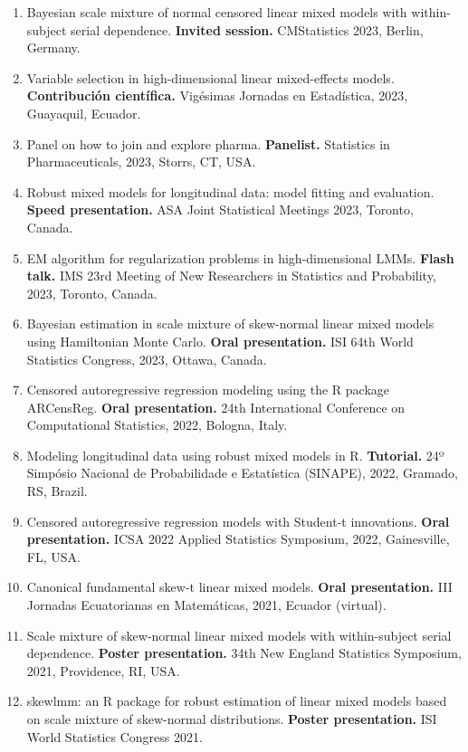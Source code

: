 \documentclass[
  10pt,
  letterpaper,
]{article}
\begin{document}
\begin{enumerate}
  Storrs, CT, USA.
\item
  Bayesian scale mixture of normal censored linear mixed models with
  within-subject serial dependence. \textbf{Invited session.}
  CMStatistics 2023, Berlin, Germany.
\item
  Variable selection in high-dimensional linear mixed-effects models.
  \textbf{Contribución científica.} Vigésimas Jornadas en Estadística,
  2023, Guayaquil, Ecuador.
\item
  Panel on how to join and explore pharma. \textbf{Panelist.} Statistics
  in Pharmaceuticals, 2023, Storrs, CT, USA.
\item
  Robust mixed models for longitudinal data: model fitting and
  evaluation. \textbf{Speed presentation.} ASA Joint Statistical
  Meetings 2023, Toronto, Canada.
\item
  EM algorithm for regularization problems in high-dimensional LMMs.
  \textbf{Flash talk.} IMS 23rd Meeting of New Researchers in Statistics
  and Probability, 2023, Toronto, Canada.
\item
  Bayesian estimation in scale mixture of skew-normal linear mixed
  models using Hamiltonian Monte Carlo. \textbf{Oral presentation.} ISI
  64th World Statistics Congress, 2023, Ottawa, Canada.
\item
  Censored autoregressive regression modeling using the R package
  ARCensReg. \textbf{Oral presentation.} 24th International Conference
  on Computational Statistics, 2022, Bologna, Italy.
\item
  Modeling longitudinal data using robust mixed models in R.
  \textbf{Tutorial.} 24º Simpósio Nacional de Probabilidade e
  Estatística (SINAPE), 2022, Gramado, RS, Brazil.
\item
  Censored autoregressive regression models with Student-t innovations.
  \textbf{Oral presentation.} ICSA 2022 Applied Statistics Symposium,
  2022, Gainesville, FL, USA.
\item
  Canonical fundamental skew-t linear mixed models. \textbf{Oral
  presentation.} III Jornadas Ecuatorianas en Matemáticas, 2021, Ecuador
  (virtual).
\item
  Scale mixture of skew-normal linear mixed models with within-subject
  serial dependence. \textbf{Poster presentation.} 34th New England
  Statistics Symposium, 2021, Providence, RI, USA.
\item
  skewlmm: an R package for robust estimation of linear mixed models
  based on scale mixture of skew-normal distributions. \textbf{Poster
  presentation.} ISI World Statistics Congress 2021.

\end{enumerate}
\end{document}
